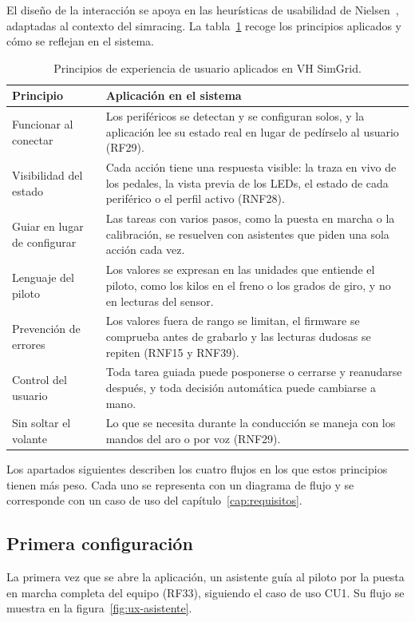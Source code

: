 El diseño de la interacción se apoya en las heurísticas de usabilidad de Nielsen~\cite{nielsen1994}, adaptadas al contexto del simracing. La tabla~\ref{tab:principios-ux} recoge los principios aplicados y cómo se reflejan en el sistema.

\begin{table}[H]
	\centering
	\caption{Principios de experiencia de usuario aplicados en VH SimGrid.}
	\label{tab:principios-ux}
	\small
	\begin{tabularx}{\textwidth}{@{}>{\raggedright\arraybackslash}p{3.6cm}X@{}}
		\toprule
		\textbf{Principio} & \textbf{Aplicación en el sistema} \\
		\midrule
		Funcionar al conectar & Los periféricos se detectan y se configuran solos, y la aplicación lee su estado real en lugar de pedírselo al usuario (RF29). \\
		Visibilidad del estado & Cada acción tiene una respuesta visible: la traza en vivo de los pedales, la vista previa de los LEDs, el estado de cada periférico o el perfil activo (RNF28). \\
		Guiar en lugar de configurar & Las tareas con varios pasos, como la puesta en marcha o la calibración, se resuelven con asistentes que piden una sola acción cada vez. \\
		Lenguaje del piloto & Los valores se expresan en las unidades que entiende el piloto, como los kilos en el freno o los grados de giro, y no en lecturas del sensor. \\
		Prevención de errores & Los valores fuera de rango se limitan, el firmware se comprueba antes de grabarlo y las lecturas dudosas se repiten (RNF15 y RNF39). \\
		Control del usuario & Toda tarea guiada puede posponerse o cerrarse y reanudarse después, y toda decisión automática puede cambiarse a mano. \\
		Sin soltar el volante & Lo que se necesita durante la conducción se maneja con los mandos del aro o por voz (RNF29). \\
		\bottomrule
	\end{tabularx}
\end{table}

Los apartados siguientes describen los cuatro flujos en los que estos principios tienen más peso. Cada uno se representa con un diagrama de flujo y se corresponde con un caso de uso del capítulo~\ref{cap:requisitos}.

\subsection{Primera configuración}
\label{subsec:ux-asistente}
La primera vez que se abre la aplicación, un asistente guía al piloto por la puesta en marcha completa del equipo (RF33), siguiendo el caso de uso CU1. Su flujo se muestra en la figura~\ref{fig:ux-asistente}.

